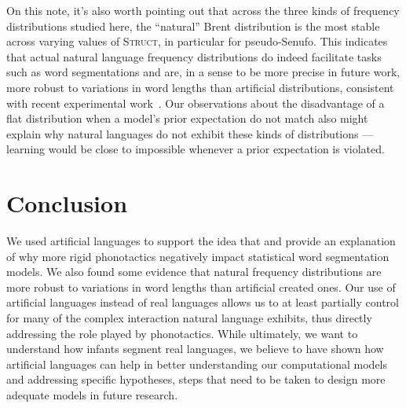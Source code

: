 \documentclass[11pt]{article}
\begin{document}
On this note, it's also worth pointing out that across the three kinds of frequency distributions studied here, the ``natural'' Brent distribution is the most stable across varying values of \textsc{Struct}, in particular for pseudo-Senufo. This indicates that actual natural language frequency distributions do indeed facilitate tasks such as word segmentations and are, in a sense to be more precise in future work, more robust to variations in word lengths than artificial distributions, consistent with recent experimental work~\cite{Kurumada13a}. Our observations about the disadvantage of a flat distribution when a model's prior expectation do not match also might explain why natural languages do not exhibit these kinds of distributions --- learning would be close to impossible whenever a prior expectation is violated.

\section{Conclusion}
\vspace*{-5pt}
We used artificial languages to support the idea that and provide an explanation of why more rigid phonotactics negatively impact statistical word segmentation models. We also found some evidence that natural frequency distributions are more robust to variations in word lengths than artificial created ones. Our use of artificial languages instead of real languages allows us to at least partially control for many of the complex interaction natural language exhibits, thus directly addressing the role played by phonotactics. While ultimately, we want to understand how infants segment real languages, we believe to have shown how artificial languages can help in better understanding our computational models and addressing specific hypotheses, steps that need to be taken to design more adequate models in future research.


\end{document}
